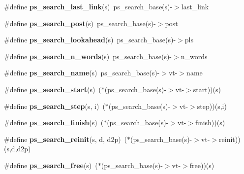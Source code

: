 \begin{DoxyCompactItemize}
\item 
\#define {\bfseries ps\-\_\-search\-\_\-last\-\_\-link}(s)~ps\-\_\-search\-\_\-base(s)-\/$>$last\-\_\-link\label{pocketsphinx__internal_8h_a9ae7d942e4206b4184cc073a87d2dc82}

\item 
\#define {\bfseries ps\-\_\-search\-\_\-post}(s)~ps\-\_\-search\-\_\-base(s)-\/$>$post\label{pocketsphinx__internal_8h_ac8707bfd426dfd0eceb1e57836c0ac91}

\item 
\#define {\bfseries ps\-\_\-search\-\_\-lookahead}(s)~ps\-\_\-search\-\_\-base(s)-\/$>$pls\label{pocketsphinx__internal_8h_a890584ac65d28cd404d66adf631fac7c}

\item 
\#define {\bfseries ps\-\_\-search\-\_\-n\-\_\-words}(s)~ps\-\_\-search\-\_\-base(s)-\/$>$n\-\_\-words\label{pocketsphinx__internal_8h_aaba5c849ae487b5a3fff0210f4687e25}

\item 
\#define {\bfseries ps\-\_\-search\-\_\-name}(s)~ps\-\_\-search\-\_\-base(s)-\/$>$vt-\/$>$name\label{pocketsphinx__internal_8h_a6ff1216eb4c0053ecdfe6096d79f02f7}

\item 
\#define {\bfseries ps\-\_\-search\-\_\-start}(s)~($\ast$(ps\-\_\-search\-\_\-base(s)-\/$>$vt-\/$>$start))(s)\label{pocketsphinx__internal_8h_ac905db8dfa65727e787c44f40d80239c}

\item 
\#define {\bfseries ps\-\_\-search\-\_\-step}(s, i)~($\ast$(ps\-\_\-search\-\_\-base(s)-\/$>$vt-\/$>$step))(s,i)\label{pocketsphinx__internal_8h_a3e3be8540f1e419fe4dfa1a063c4e8be}

\item 
\#define {\bfseries ps\-\_\-search\-\_\-finish}(s)~($\ast$(ps\-\_\-search\-\_\-base(s)-\/$>$vt-\/$>$finish))(s)\label{pocketsphinx__internal_8h_a52d4cf988efa2211c86a2168de346032}

\item 
\#define {\bfseries ps\-\_\-search\-\_\-reinit}(s, d, d2p)~($\ast$(ps\-\_\-search\-\_\-base(s)-\/$>$vt-\/$>$reinit))(s,d,d2p)\label{pocketsphinx__internal_8h_a071483ece6369091cc50334f5be1124b}

\item 
\#define {\bfseries ps\-\_\-search\-\_\-free}(s)~($\ast$(ps\-\_\-search\-\_\-base(s)-\/$>$vt-\/$>$free))(s)\label{pocketsphinx__internal_8h_ac5475853d99524bb4c933c42df58118b}


\end{DoxyCompactItemize}
